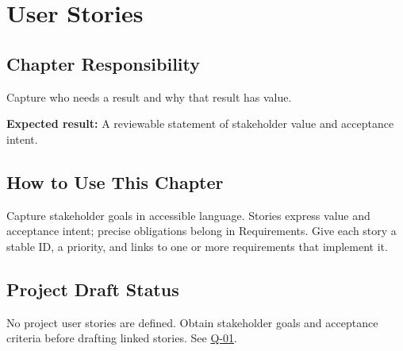 \chapter{User Stories}
\section{Chapter Responsibility}
\label{Section:UserStoriesResponsibility}
Capture who needs a result and why that result has value.

\noindent\textbf{Expected result:} A reviewable statement of stakeholder value and acceptance intent.

\section{How to Use This Chapter}
Capture stakeholder goals in accessible language. Stories express value and
acceptance intent; precise obligations belong in Requirements. Give each story
a stable ID, a priority, and links to one or more requirements that implement it.

\section{Project Draft Status}
No project user stories are defined. Obtain stakeholder goals and acceptance criteria before drafting linked stories. See \hyperref[Question:Q-01]{Q-01}.
